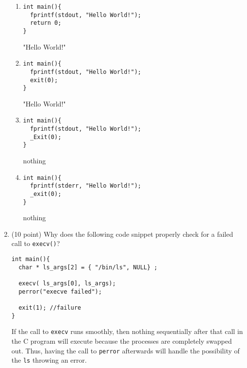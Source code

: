 \documentclass{article}[9pt]
\newenvironment{answerfont}{\fontfamily{qhv}\selectfont}{\par}
\newenvironment{myanswer}{\begin{mdframed}\begin{answerfont}}{\end{answerfont}\end{mdframed}}
\begin{document}
\begin{enumerate}
\begin{enumerate}
\item
\begin{verbatim}
int main(){
  fprintf(stdout, "Hello World!");
  return 0;
}
\end{verbatim}

  \begin{myanswer}
    "Hello World!"
  \end{myanswer}

\item
\begin{verbatim}
int main(){
  fprintf(stdout, "Hello World!");
  exit(0);
}
\end{verbatim}

  \begin{myanswer}
    "Hello World!"
  \end{myanswer}

\item
\begin{verbatim}
int main(){
  fprintf(stdout, "Hello World!");
  _Exit(0);
}
\end{verbatim}

  \begin{myanswer}
    nothing
  \end{myanswer}

\item
\begin{verbatim}
int main(){
  fprintf(stderr, "Hello World!");
  _exit(0);
}
\end{verbatim}
  
  \begin{myanswer}
    nothing
  \end{myanswer}

\end{enumerate}

\item (10 point) Why does the following code snippet properly check for a failed
call to \texttt{execv()}?

\begin{verbatim}
int main(){
  char * ls_args[2] = { "/bin/ls", NULL} ;

  execv( ls_args[0], ls_args);
  perror("execve failed");

  exit(1); //failure
}
\end{verbatim}

  \begin{myanswer}
    If the call to \texttt{execv} runs smoothly, then nothing
    sequentially after that call in the C program will execute because
    the processes are completely swapped out.  Thus, having the call to
    \texttt{perror} afterwards will handle the possibility of the
    \texttt{ls} throwing an error.
  \end{myanswer}


\end{enumerate}
\end{document}

